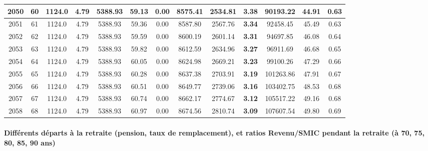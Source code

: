 {\begin{center}
\begin{tabular}[htb]{|c|c||c|c|c|c|c|c||c|c||c|c|c||}
\hline 
 2050 &  60 &  1124.0 &  4.79 &  5388.93 &  59.13 &  0.00 &  8575.41 &  2534.81 &  {\bf 3.38} &  90193.22 &  44.91 &  0.63 \\ 
\hline 
 2051 &  61 &  1124.0 &  4.79 &  5388.93 &  59.36 &  0.00 &  8587.80 &  2567.76 &  {\bf 3.34} &  92458.45 &  45.49 &  0.63 \\ 
\hline 
 2052 &  62 &  1124.0 &  4.79 &  5388.93 &  59.59 &  0.00 &  8600.19 &  2601.14 &  {\bf 3.31} &  94697.85 &  46.08 &  0.64 \\ 
\hline 
 2053 &  63 &  1124.0 &  4.79 &  5388.93 &  59.82 &  0.00 &  8612.59 &  2634.96 &  {\bf 3.27} &  96911.69 &  46.68 &  0.65 \\ 
\hline 
 2054 &  64 &  1124.0 &  4.79 &  5388.93 &  60.05 &  0.00 &  8624.98 &  2669.21 &  {\bf 3.23} &  99100.26 &  47.29 &  0.66 \\ 
\hline 
 2055 &  65 &  1124.0 &  4.79 &  5388.93 &  60.28 &  0.00 &  8637.38 &  2703.91 &  {\bf 3.19} &  101263.86 &  47.91 &  0.67 \\ 
\hline 
 2056 &  66 &  1124.0 &  4.79 &  5388.93 &  60.51 &  0.00 &  8649.77 &  2739.06 &  {\bf 3.16} &  103402.75 &  48.53 &  0.68 \\ 
\hline 
 2057 &  67 &  1124.0 &  4.79 &  5388.93 &  60.74 &  0.00 &  8662.17 &  2774.67 &  {\bf 3.12} &  105517.22 &  49.16 &  0.68 \\ 
\hline 
 2058 &  68 &  1124.0 &  4.79 &  5388.93 &  60.97 &  0.00 &  8674.56 &  2810.74 &  {\bf 3.09} &  107607.54 &  49.80 &  0.69 \\ 
\hline 
\hline 
\end{tabular} 
\end{center} } 
\newpage 
 
\paragraph{Différents départs à la retraite (pension, taux de remplacement), et ratios Revenu/SMIC pendant la retraite (à 70, 75, 80, 85, 90 ans)} 

